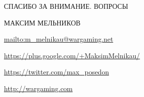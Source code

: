 \documentclass[aspectratio=169]{beamer}
\begin{document}
{



\begin{frame}{СПАСИБО ЗА ВНИМАНИЕ. ВОПРОСЫ}
    \begin{block}{МАКСИМ МЕЛЬНИКОВ}
    \par \url{mailto:m\_melnikau@wargaming.net}
    \par \url{https://plus.google.com/+MaksimMelnikau/}
    \par \url{https://twitter.com/max\_posedon}
    \par \url{http://wargaming.com}
    \end{block}
\end{frame}
}
\end{document}
